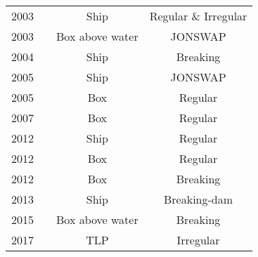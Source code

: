 \begin{table}[]
\begin{tabular}{ll|cc}
		2003                                   & \citet{Ogawa2003}                               & Ship                                        & Regular \& Irregular                     \\
		2003                                   & \citet{Mori2003}                                & Box above water                                         & JONSWAP                               \\
		2004                                   & \citet{Greco2004}                               & Ship                                        & Breaking                                 \\
		2005                                   & \citet{Soares2005}                              & Ship                                        & JONSWAP                               \\
		2005                                   & \citet{Greco2005}                               & Box                                         & Regular                                 \\
		2007                                   & \citet{Greco2007}                               & Box                                         & Regular                                  \\
		2012                                   & \citet{Greco2012}                               & Ship                                        & Regular                                \\
		2012                                   & \citet{Lee2012}                                & Box                                         & Regular                                 \\
		2012                                   & \citet{Ariyarathne2012}                         & Box                                         & Breaking                                \\
		2013                                   & \citet{Liut2013}                                & Ship                                        & Breaking-dam                              \\
		2015                                   & \citet{Song2015}                                & Box above water                                         & Breaking                               \\
		2017                                   & \citet{Abdussamie2017}                          & TLP                                         & Irregular                               \\

\end{tabular}
\end{table}
